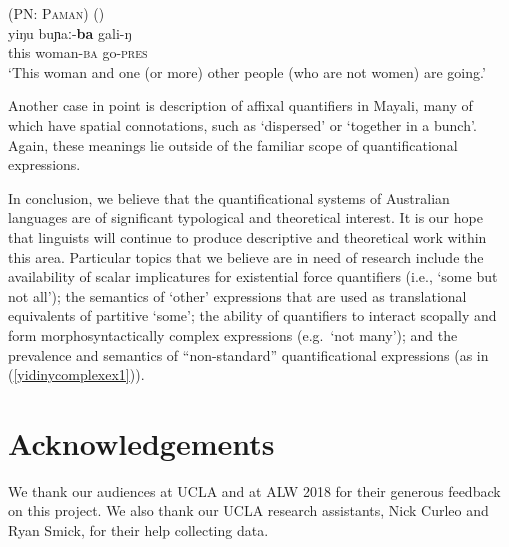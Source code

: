 \documentclass[12pt,egregdoesnotlikesansseriftitles]{scrartcl}
\begin{document}

\begin{exe}
  \ex \textsc{ (PN: Paman)} \hfill (\citealt[146]{dixon77}) \label{yidinycomplexex1}\\
  \gll yiŋu buɲaː-\textbf{ba}  gali-ŋ\\
  this woman-\textsc{ba}  go-\textsc{pres} \\
  \glt `This woman and one (or more) other people (who are not women) are going.'
\end{exe}

Another case in point is  description of affixal quantifiers in Mayali, many of which have spatial connotations, such as `dispersed' or `together in a bunch'. Again, these meanings lie outside of the familiar scope of quantificational expressions.

In conclusion, we believe that the quantificational systems of Australian languages are of significant typological and theoretical interest. It is our hope that linguists will continue to produce descriptive and theoretical work within this area. Particular topics that we believe are in need of research include the availability of scalar implicatures for existential force quantifiers (i.e., `some but not all'); the semantics of `other' expressions that are used as translational equivalents of partitive `some'; the ability of quantifiers to interact scopally and form morphosyntactically complex expressions (e.g.\ `not many'); and the prevalence and semantics of ``non-standard'' quantificational expressions (as in (\ref{yidinycomplexex1})). 

\section*{Acknowledgements}

We thank our audiences at UCLA and at ALW 2018 for their generous feedback on this project. We also thank our UCLA research assistants, Nick Curleo and Ryan Smick, for their help collecting data. %


\printbibliography
\end{document}
